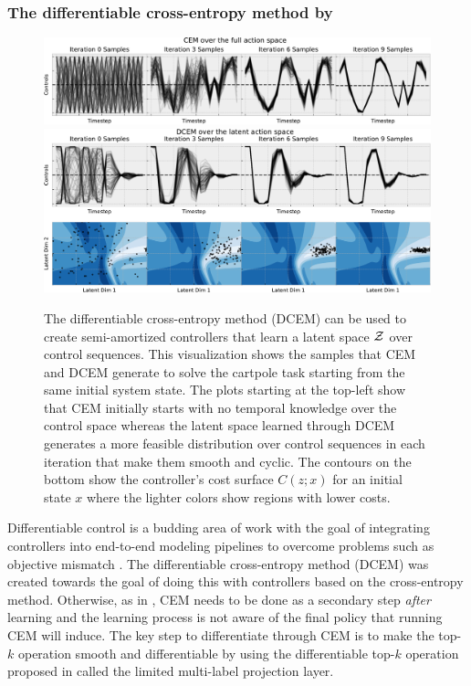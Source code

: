\documentclass[twoside,11pt]{article}
\begin{document}
\subsubsection{The differentiable cross-entropy method by \citet{amos2019dcem}}

\begin{figure}[t]
  \centering
  \includegraphics[width=\textwidth]{fig/dcem/cem-vis-full-space.pdf} \\[4mm]
  \includegraphics[width=\textwidth]{fig/dcem/cem-vis-latent-space.pdf}
  \caption{
    The differentiable cross-entropy method (DCEM) can be used
    to create semi-amortized controllers that learn a
    latent space ${\mathcal{Z}}$ over control sequences.
    This visualization shows the samples that CEM and DCEM generate
    to solve the cartpole task starting from the same initial
    system state.
    The plots starting at the top-left show that CEM initially starts with
    no temporal knowledge over the control space whereas
    the latent space learned through DCEM generates a more
    feasible distribution over control sequences
    in each iteration that make them smooth and cyclic.
    The contours on the bottom show the controller's cost
    surface $C(z; x)$ for an initial state $x$ where
    the lighter colors show regions with lower costs.
  }
  \label{fig:dcem}
\end{figure}

Differentiable control \citep{amos2018dmpc} is a budding area
of work with the goal of integrating controllers into
end-to-end modeling pipelines to overcome problems
such as objective mismatch \citep{lambert2020objective}.
The differentiable cross-entropy method (DCEM) was created
towards the goal of doing this with controllers
based on the cross-entropy method.
Otherwise, as in \citet{wang2019exploring}, CEM needs to be done as
a secondary step \emph{after} learning and the learning process is
not aware of the final policy that running CEM will induce.
The key step to differentiate through CEM is to make the
top-$k$ operation smooth and differentiable by using the
differentiable top-$k$ operation proposed in
\citet{amos2019limited} called the limited multi-label projection layer.
\end{document}
